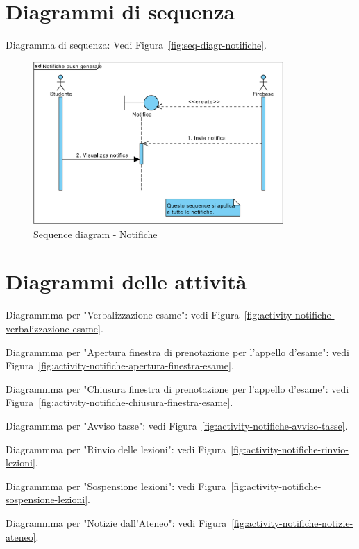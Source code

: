 \section{Diagrammi di sequenza}

Diagramma di sequenza: Vedi Figura~\vref{fig:seq-diagr-notifiche}.

\begin{figure}
	\centering
	\includegraphics[width=0.85\textwidth]{imgs/gruppo2/sequence-notifiche}
	\caption{Sequence diagram - Notifiche}
	\label{fig:seq-diagr-notifiche}
\end{figure}

\section{Diagrammi delle attività}

Diagrammma per "Verbalizzazione esame": vedi Figura~\vref{fig:activity-notifiche-verbalizzazione-esame}.

Diagrammma per "Apertura finestra di prenotazione per l'appello d'esame": vedi Figura~\vref{fig:activity-notifiche-apertura-finestra-esame}.

Diagrammma per "Chiusura finestra di prenotazione per l'appello d'esame": vedi Figura~\vref{fig:activity-notifiche-chiusura-finestra-esame}.

Diagrammma per "Avviso tasse": vedi Figura~\vref{fig:activity-notifiche-avviso-tasse}.

Diagrammma per "Rinvio delle lezioni": vedi Figura~\vref{fig:activity-notifiche-rinvio-lezioni}.

Diagrammma per "Sospensione lezioni": vedi Figura~\vref{fig:activity-notifiche-sospensione-lezioni}.

Diagrammma per "Notizie dall'Ateneo": vedi Figura~\vref{fig:activity-notifiche-notizie-ateneo}.

